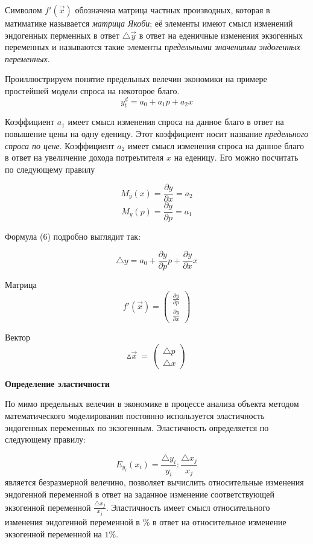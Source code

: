 \documentclass[12pt,a4paper]{article}
\begin{document}
Символом $f'(\vec{x})$ обозначена матрица частных производных, которая в матиматике называется \textit{матрица Якоби}; её элементы имеют смысл изменений эндогенных перменных в ответ $\triangle \vec{y}$ в ответ на еденичные изменения экзогенных переменных и называются такие элементы п\textit{редельными значениями эндогенных переменных}. 

Проиллюстрируем понятие предельных велечин экономики на примере простейшей модели спроса на некоторое благо.
$$y_t^d = a_0 + a_1 p + a_2  x$$

Коэффициент $a_1$ имеет смысл изменения спроса на данное благо в ответ на повышение цены на одну еденицу. Этот коэффициент носит название \textit{предельного спроса по цене}. Коэффициент $a_2$ имеет смысл изменения спроса на данное благо в ответ на увеличение дохода потреьтителя $x$ на еденицу. Его можно посчитать по следующему правилу

$$M_y(x) = \frac{\partial y}{\partial x} = a_2$$
$$M_y(p) = \frac{\partial y}{\partial p} = a_1$$

Формула (6) подробно выглядит так:

$$\triangle y = a_0 + \frac{\partial y}{\partial p} p + \frac{\partial y}{\partial x} x$$

Матрица 
\begin{equation*}
f'\left(\vec{x}\right) =\begin{pmatrix}
\frac{\partial y}{\partial p}\\
\frac{\partial y}{\partial x}
\end{pmatrix}
\end{equation*}

Вектор 
\begin{equation*}
\vartriangle \vec{x} \ =\ \begin{pmatrix}
\triangle p\\
\triangle x
\end{pmatrix}
\end{equation*}

\begin{center}
\textbf{Определение эластичности}
\end{center}

По мимо предельных велечин в экономике в процессе анализа объекта методом математического моделирования постоянно используется эластичность эндогенных переменных по экзогенным. Эластичность определяется по следующему правилу:

\begin{equation}
E_{y_i}(x_i) = \frac{\triangle y_i}{y_i} : \frac{\triangle x_j}{x_j}
\end{equation}
является безразмерной велечино, позволяет вычислить относительные изменения эндогенной переменной в ответ на заданное изменение соответствующей экзогенной переменной $\displaystyle{\frac{\triangle x_j}{x_j}}$. Эластичность имеет смысл относительного изменения эндогенной переменной в $\%$ в ответ на относительное изменение экзогенной переменной на $1\%$.
\end{document}
